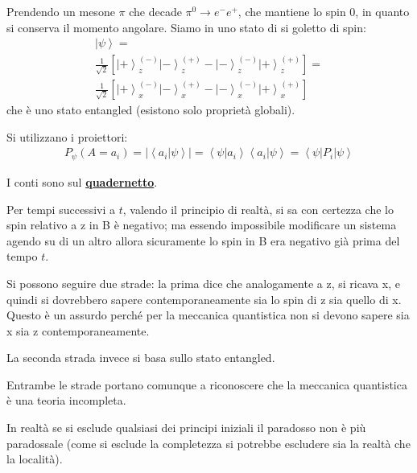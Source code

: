 Prendendo un mesone $\pi$ che decade $\pi^0\rightarrow e^-e^+$, che mantiene lo spin 0, in quanto si conserva il momento angolare. Siamo in uno stato di si goletto di spin:
\begin{equation}\begin{split}
\left |\psi  \right\rangle=\\
\frac{1}{\sqrt{2}}\left[\left |+ \right\rangle_z^{\left(-\right)}\left |- \right\rangle_z^{\left(+\right)}-\left |- \right\rangle_z^{\left(-\right)}\left |+ \right\rangle_z^{\left(+\right)}\right]=\\
\frac{1}{\sqrt{2}}\left[\left |+ \right\rangle_x^{\left(-\right)}\left |- \right\rangle_x^{\left(+\right)}-\left |- \right\rangle_x^{\left(-\right)}\left |+ \right\rangle_x^{\left(+\right)}\right]
\end{split}\end{equation} 
che è uno stato entangled (esistono solo proprietà globali).

Si utilizzano i proiettori:
\begin{equation}\begin{split}
P_{\psi }\left(A=a_i\right)=\left|\left\langle a_i|\psi  \right\rangle\right|=\left\langle \psi |a_i \right\rangle\left\langle a_i|\psi  \right\rangle=\left\langle \psi \right |P_i\left |\psi  \right\rangle
\end{split}\end{equation}

I conti sono sul \textbf{\href{http://www2.pv.infn.it/~nicrosi/paradosso/home.htm}{quadernetto}}.


Per tempi successivi a $t$, valendo il principio di realtà, si sa con certezza che lo spin relativo a z in B è negativo; ma essendo impossibile modificare un sistema agendo su di un altro allora sicuramente lo spin in B era negativo già prima del tempo $t$.

Si possono seguire due strade: la prima dice che analogamente a z, si ricava x, e quindi si dovrebbero sapere contemporaneamente sia lo spin di z sia quello di x. Questo è un assurdo perché per la meccanica quantistica non si devono sapere sia x sia z contemporaneamente.

La seconda strada invece si basa sullo stato entangled. %

Entrambe le strade portano comunque a riconoscere che la meccanica quantistica è una teoria incompleta.

In realtà se si esclude qualsiasi dei principi iniziali il paradosso non è più paradossale (come si esclude la completezza si potrebbe escludere sia la realtà che la località).